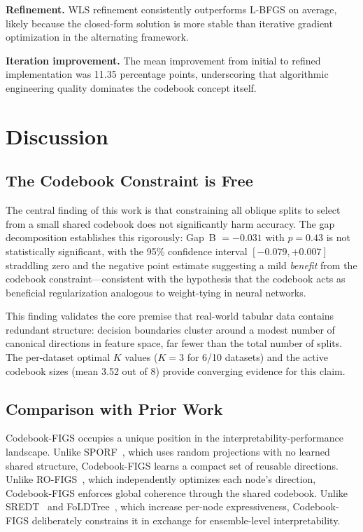 \documentclass[11pt,letterpaper]{article}
\begin{document}
\textbf{Refinement.} WLS refinement consistently outperforms L-BFGS on average, likely because the closed-form solution is more stable than iterative gradient optimization in the alternating framework.

\textbf{Iteration improvement.} The mean improvement from initial to refined implementation was 11.35 percentage points, underscoring that algorithmic engineering quality dominates the codebook concept itself.

\section{Discussion}

\subsection{The Codebook Constraint is Free}

The central finding of this work is that constraining all oblique splits to select from a small shared codebook does not significantly harm accuracy. The gap decomposition establishes this rigorously: Gap~B $= -0.031$ with $p = 0.43$ is not statistically significant, with the 95\% confidence interval $[-0.079, +0.007]$ straddling zero and the negative point estimate suggesting a mild \emph{benefit} from the codebook constraint---consistent with the hypothesis that the codebook acts as beneficial regularization analogous to weight-tying in neural networks.

This finding validates the core premise that real-world tabular data contains redundant structure: decision boundaries cluster around a modest number of canonical directions in feature space, far fewer than the total number of splits. The per-dataset optimal $K$ values ($K = 3$ for 6/10 datasets) and the active codebook sizes (mean 3.52 out of 8) provide converging evidence for this claim.

\subsection{Comparison with Prior Work}

Codebook-FIGS occupies a unique position in the interpretability-performance landscape. Unlike SPORF~\citep{Tomita2020}, which uses random projections with no learned shared structure, Codebook-FIGS learns a compact set of reusable directions. Unlike RO-FIGS~\citep{Mattikalli2025}, which independently optimizes each node's direction, Codebook-FIGS enforces global coherence through the shared codebook. Unlike SREDT~\citep{Fong2024} and FoLDTree~\citep{Wang2024}, which increase per-node expressiveness, Codebook-FIGS deliberately constrains it in exchange for ensemble-level interpretability.
\end{document}
